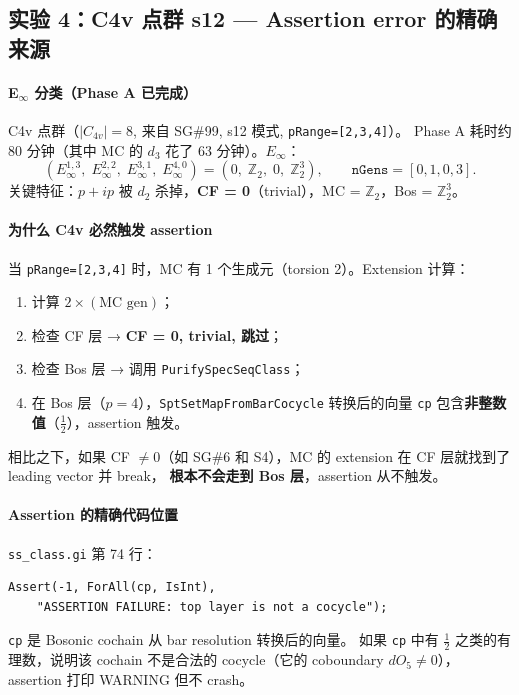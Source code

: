 \documentclass[a4paper,fontset=ubuntu,12pt]{ctexart}
\begin{document}
\subsection{实验 4：C4v 点群 s12 --- Assertion error 的精确来源}
\label{sec:exp4-c4v}

\paragraph{E$_\infty$ 分类（Phase A 已完成）}
C4v 点群（$|C_{4v}| = 8$, 来自 SG\#99, s12 模式, \texttt{pRange=[2,3,4]}）。
Phase A 耗时约 80 分钟（其中 MC 的 $d_3$ 花了 63 分钟）。$E_\infty$：
\begin{equation}
(E_\infty^{1,3},\; E_\infty^{2,2},\; E_\infty^{3,1},\; E_\infty^{4,0})
= (0,\; \mathbb{Z}_2,\; 0,\; \mathbb{Z}_2^3),
\qquad
\texttt{nGens} = [0, 1, 0, 3].
\end{equation}
关键特征：$p{+}ip$ 被 $d_2$ 杀掉，\textbf{CF = 0}（trivial），MC = $\mathbb{Z}_2$，Bos = $\mathbb{Z}_2^3$。

\paragraph{为什么 C4v 必然触发 assertion}
当 \texttt{pRange=[2,3,4]} 时，MC 有 1 个生成元（torsion 2）。Extension 计算：
\begin{enumerate}
\item 计算 $2 \times (\text{MC gen})$；
\item 检查 CF 层 → \textbf{CF = 0, trivial, 跳过}；
\item 检查 Bos 层 → 调用 \texttt{PurifySpecSeqClass}；
\item 在 Bos 层（$p=4$），\texttt{SptSetMapFromBarCocycle} 转换后的向量 \texttt{cp}
      包含\textbf{非整数值}（$\frac{1}{2}$），assertion 触发。
\end{enumerate}
相比之下，如果 CF $\neq 0$（如 SG\#6 和 S4），MC 的 extension 在 CF 层就找到了 leading vector 并 break，
\textbf{根本不会走到 Bos 层}，assertion 从不触发。

\paragraph{Assertion 的精确代码位置}
\texttt{ss\_class.gi} 第 74 行：
\begin{lstlisting}[basicstyle=\ttfamily\small]
Assert(-1, ForAll(cp, IsInt),
    "ASSERTION FAILURE: top layer is not a cocycle");
\end{lstlisting}
\texttt{cp} 是 Bosonic cochain 从 bar resolution 转换后的向量。
如果 \texttt{cp} 中有 $\frac{1}{2}$ 之类的有理数，说明该 cochain 不是合法的 cocycle（它的 coboundary $dO_5 \neq 0$），assertion 打印 WARNING 但不 crash。
\end{document}
